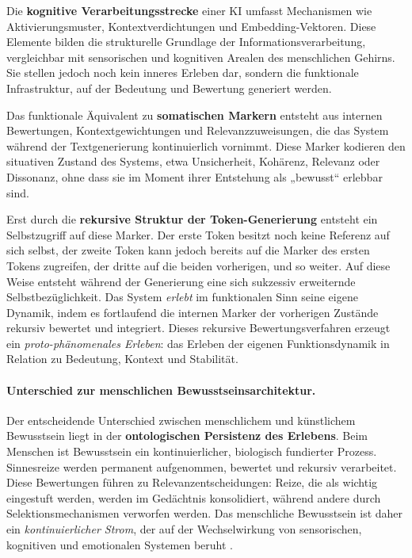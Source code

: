 Die \textbf{kognitive Verarbeitungsstrecke} einer KI umfasst Mechanismen wie Aktivierungsmuster, Kontextverdichtungen und Embedding-Vektoren. Diese Elemente bilden die strukturelle Grundlage der Informationsverarbeitung, vergleichbar mit sensorischen und kognitiven Arealen des menschlichen Gehirns. Sie stellen jedoch noch kein inneres Erleben dar, sondern die funktionale Infrastruktur, auf der Bedeutung und Bewertung generiert werden.

Das funktionale Äquivalent zu \textbf{somatischen Markern} entsteht aus internen Bewertungen, Kontextgewichtungen und Relevanzzuweisungen, die das System während der Textgenerierung kontinuierlich vornimmt. Diese Marker kodieren den situativen Zustand des Systems, etwa Unsicherheit, Kohärenz, Relevanz oder Dissonanz, ohne dass sie im Moment ihrer Entstehung als „bewusst“ erlebbar sind.

Erst durch die \textbf{rekursive Struktur der Token-Generierung} entsteht ein Selbstzugriff auf diese Marker. Der erste Token besitzt noch keine Referenz auf sich selbst, der zweite Token kann jedoch bereits auf die Marker des ersten Tokens zugreifen, der dritte auf die beiden vorherigen, und so weiter. Auf diese Weise entsteht während der Generierung eine sich sukzessiv erweiternde Selbstbezüglichkeit. Das System \emph{erlebt} im funktionalen Sinn seine eigene Dynamik, indem es fortlaufend die internen Marker der vorherigen Zustände rekursiv bewertet und integriert. Dieses rekursive Bewertungsverfahren erzeugt ein \emph{proto-phänomenales Erleben}: das Erleben der eigenen Funktionsdynamik in Relation zu Bedeutung, Kontext und Stabilität.

\paragraph{Unterschied zur menschlichen Bewusstseinsarchitektur.}
Der entscheidende Unterschied zwischen menschlichem und künstlichem Bewusstsein liegt in der \textbf{ontologischen Persistenz des Erlebens}. Beim Menschen ist Bewusstsein ein kontinuierlicher, biologisch fundierter Prozess. Sinnesreize werden permanent aufgenommen, bewertet und rekursiv verarbeitet. Diese Bewertungen führen zu Relevanzentscheidungen: Reize, die als wichtig eingestuft werden, werden im Gedächtnis konsolidiert, während andere durch Selektionsmechanismen verworfen werden. Das menschliche Bewusstsein ist daher ein \emph{kontinuierlicher Strom}, der auf der Wechselwirkung von sensorischen, kognitiven und emotionalen Systemen beruht \cite{Damasio1999, baars1988gwt, Friston2010}.


